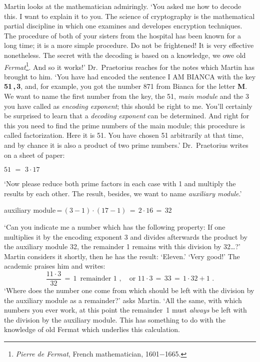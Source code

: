 Martin looks at the mathematician admiringly.
`You asked me how to decode this.
I want to explain it to you. 
The science of cryptography is the mathematical partial discipline in which one examines and developes encryption 
techniques. The procedure of both of your sisters from the hospital has been known for a long time; it is a more 
simple procedure. 
Do not be frightened! It is very effective nonetheless. 
The secret with the decoding is based on a knowledge, we owe old {\em Fermat\/}\footnote{{\em Pierre de Fermat\/}, 
French mathematician, 1601$-$1665.}. And so it works!' 
Dr.~Praetorius reaches for the notes which Martin has brought to him. 
`You have had encoded the sentence I AM BIANCA with the key {\bf 51\,,\,3}, and, for example, you got the number 871 
from Bianca for the letter {\bf M}.
We want to name the first number from the key, the 51, {\em main module\/} and the 3 you have called 
as {\em encoding exponent\/}; this should be right to me. 
You'll certainly be surprised to learn that a {\em decoding exponent\/} can be determined. 
And right for this you need to find the prime numbers of the main module; this procedure is called factorization.
Here it is 51. You have chosen 51 arbitrarily at that time, and by chance it is also a product of two prime numbers.' 
Dr.~Praetorius writes on a sheet of paper: 
\begin{center} 
\(51 \, \, = \, \, 3\cdot 17 \) 
\end{center} 
`Now please reduce both prime factors in each case with 1 and multiply the results by each other. 
The result, besides, we want to name {\em auxiliary module\/}.' 
\begin{center} 
auxiliary module\,=\,\((3-1)\cdot (17-1)\,=\,2\cdot 16 \,=\,32 \)
\end{center}
`Can you indicate me a number which has the following property: 
If one multiplies it by the encoding exponent 3 and divides afterwards the product by the auxiliary module 32, 
the remainder 1 remains with this division by 32\dots?'
Martin considers it shortly, then he has the result: `Eleven.' 
`Very good!' The academic praises him and writes: 
\[
\frac{11\cdot 3}{32}\,=\,1 \,\,\,\mbox{remainder}\,\,1\,\,,\quad \mbox{or}\,\,
11\cdot 3\,=\,33\,=\,1\cdot 32 + \mbox{1}\,\,.
\]
`Where does the number one come from which should be left with the division by the auxiliary module as a 
remainder?' asks Martin. 
`All the same, with which numbers you ever work, at this point the remainder~1 must {\em always\/} be left 
with the division by the auxiliary module. 
This has something to do with the knowledge of old Fermat which underlies this calculation. 
